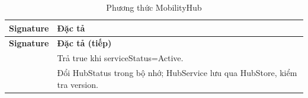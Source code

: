 
\begin{longtable}{|L{58mm}|L{81mm}|}
\caption{Phương thức MobilityHub}\\\hline
\textbf{Signature} & \textbf{Đặc tả}\\\hline
\endfirsthead
\hline\textbf{Signature} & \textbf{Đặc tả (tiếp)}\\\hline\endhead
{} & Trả true khi serviceStatus=Active.\\\hline
{} & Đổi HubStatus trong bộ nhớ; HubService lưu qua HubStore, kiểm tra version.\\\hline
\end{longtable}
